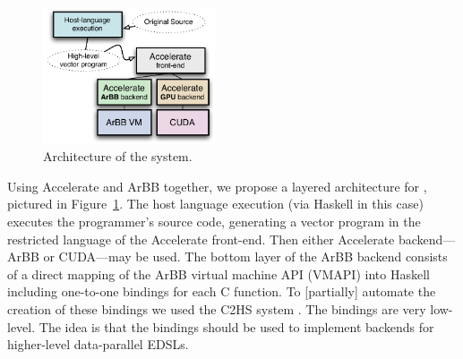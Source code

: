 

\begin{figure}
  \begin{center}
   \includegraphics[width=2.0in]{./arbb/figure_architecture}    
  \end{center}
\vspace{-5mm}
  \caption{Architecture of the \systemname{} system.  }
  \label{f:architecture}
\end{figure}


Using Accelerate and ArBB together, we propose a layered architecture
for \systemname{},
pictured in Figure~\ref{f:architecture}. 
The host language execution (via Haskell in this case) executes the
programmer's source code, generating a vector program in the
restricted language of the Accelerate front-end.
Then either Accelerate backend---ArBB or CUDA---may be used.
The 
bottom layer of the ArBB backend consists of a direct mapping of the ArBB virtual machine
API (VMAPI) into Haskell including one-to-one bindings for each C 
function. 
To [partially] automate the creation of these bindings we used the C2HS system \cite{C2HS}. The 
\arbbvmH{} bindings are very low-level.
The idea 
is that the \arbbvmH{} bindings should be used to implement
backends for higher-level data-parallel EDSLs.



